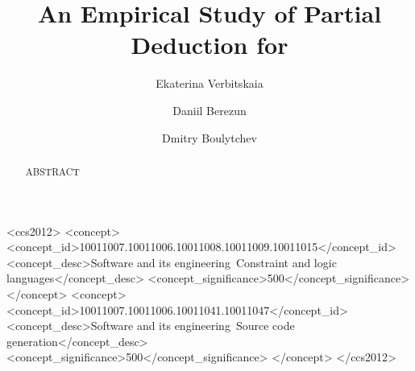 \documentclass[acmlarge]{acmart}
\begin{document}
\title{An Empirical Study of Partial Deduction for \mk{}}

\author{Ekaterina Verbitskaia}

\author{Daniil Berezun}

\author{Dmitry Boulytchev}



\renewcommand{\shortauthors}{Verbitskaia, Berezun and Boulytchev.}

\begin{abstract}
  ABSTRACT
\end{abstract}

\begin{CCSXML}
  <ccs2012>
  <concept>
  <concept_id>10011007.10011006.10011008.10011009.10011015</concept_id>
  <concept_desc>Software and its engineering~Constraint and logic languages</concept_desc>
  <concept_significance>500</concept_significance>
  </concept>
  <concept>
  <concept_id>10011007.10011006.10011041.10011047</concept_id>
  <concept_desc>Software and its engineering~Source code generation</concept_desc>
  <concept_significance>500</concept_significance>
  </concept>
  </ccs2012>
\end{CCSXML}


\maketitle









\end{document}
